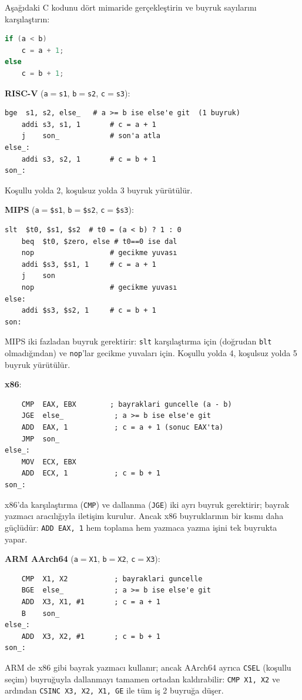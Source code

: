 \begin{ornek}[3.17]
\label{orn:dallanma-karsilastirma}
Aşağıdaki C kodunu dört mimaride gerçekleştirin ve buyruk sayılarını karşılaştırın:
\begin{lstlisting}[language=C]
if (a < b)
    c = a + 1;
else
    c = b + 1;
\end{lstlisting}

\textbf{RISC-V} (\texttt{a}$=$\texttt{s1}, \texttt{b}$=$\texttt{s2}, \texttt{c}$=$\texttt{s3}):
\begin{lstlisting}[style=riscv]
    bge  s1, s2, else_   # a >= b ise else'e git  (1 buyruk)
    addi s3, s1, 1       # c = a + 1
    j    son_            # son'a atla
else_:
    addi s3, s2, 1       # c = b + 1
son_:
\end{lstlisting}
Koşullu yolda 2, koşulsuz yolda 3 buyruk yürütülür.

\textbf{MIPS} (\texttt{a}$=$\texttt{\$s1}, \texttt{b}$=$\texttt{\$s2}, \texttt{c}$=$\texttt{\$s3}):
\begin{lstlisting}[style=mips]
    slt  $t0, $s1, $s2  # t0 = (a < b) ? 1 : 0
    beq  $t0, $zero, else # t0==0 ise dal
    nop                  # gecikme yuvası
    addi $s3, $s1, 1     # c = a + 1
    j    son
    nop                  # gecikme yuvası
else:
    addi $s3, $s2, 1     # c = b + 1
son:
\end{lstlisting}
MIPS iki fazladan buyruk gerektirir: \texttt{slt} karşılaştırma için (doğrudan \texttt{blt} olmadığından) ve \texttt{nop}'lar gecikme yuvaları için. Koşullu yolda 4, koşulsuz yolda 5 buyruk yürütülür.

\textbf{x86}:
\begin{lstlisting}
    CMP  EAX, EBX        ; bayraklari guncelle (a - b)
    JGE  else_            ; a >= b ise else'e git
    ADD  EAX, 1           ; c = a + 1 (sonuc EAX'ta)
    JMP  son_
else_:
    MOV  ECX, EBX
    ADD  ECX, 1           ; c = b + 1
son_:
\end{lstlisting}
x86'da karşılaştırma (\texttt{CMP}) ve dallanma (\texttt{JGE}) iki ayrı buyruk gerektirir; bayrak yazmacı aracılığıyla iletişim kurulur. Ancak x86 buyruklarının bir kısmı daha güçlüdür: \texttt{ADD EAX, 1} hem toplama hem yazmaca yazma işini tek buyrukta yapar.

\textbf{ARM AArch64} (\texttt{a}$=$\texttt{X1}, \texttt{b}$=$\texttt{X2}, \texttt{c}$=$\texttt{X3}):
\begin{lstlisting}
    CMP  X1, X2           ; bayraklari guncelle
    BGE  else_            ; a >= b ise else'e git
    ADD  X3, X1, #1       ; c = a + 1
    B    son_
else_:
    ADD  X3, X2, #1       ; c = b + 1
son_:
\end{lstlisting}
ARM de x86 gibi bayrak yazmacı kullanır; ancak AArch64 ayrıca \texttt{CSEL} (koşullu seçim) buyruğuyla dallanmayı tamamen ortadan kaldırabilir: \texttt{CMP X1, X2} ve ardından \texttt{CSINC X3, X2, X1, GE} ile tüm iş 2 buyruğa düşer.
\end{ornek}

